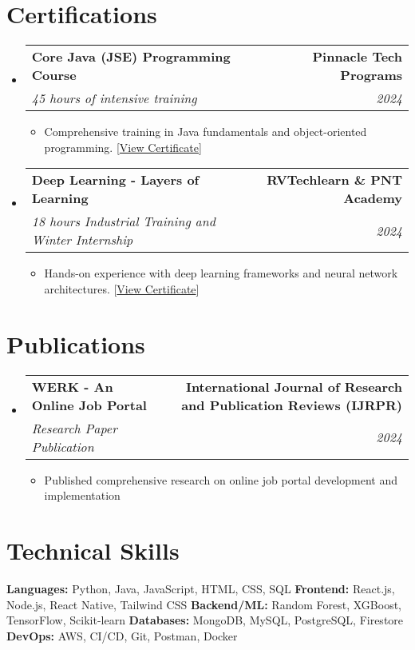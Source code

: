 \documentclass[letterpaper,11pt]{article}
\makeatletter
\newcommand{\resumeItem}[1]{
  \item\small{
    {#1 \vspace{-2pt}}
  }
}
\newcommand{\resumeSubheading}[4]{
  \vspace{-2pt}\item
  \begin{tabular*}{1.0\textwidth}[t]{l@{\extracolsep{\fill}}r}
    \textbf{#1} & \textbf{\small #2} \\
    \textit{\small#3} & \textit{\small #4} \\
  \end{tabular*}\vspace{-7pt}
}
\newcommand{\resumeSubHeadingListStart}{\begin{itemize}[leftmargin=0.0in, label={}]}
\newcommand{\resumeSubHeadingListEnd}{\end{itemize}}
\newcommand{\resumeItemListStart}{\begin{itemize}}
\newcommand{\resumeItemListEnd}{\end{itemize}\vspace{-5pt}}
\makeatother
\begin{document}
\section{Certifications}
\resumeSubHeadingListStart
  \resumeSubheading
    {Core Java (JSE) Programming Course}{Pinnacle Tech Programs}
    {45 hours of intensive training}{2024}
    \resumeItemListStart
      \resumeItem{Comprehensive training in Java fundamentals and object-oriented programming. [\href{https://drive.google.com/file/d/1Lf2cOTG3Nwv9vOYOVXjcn3a3jWpDPUBj/view?usp=sharing}{\color{blue}View Certificate}]}
    \resumeItemListEnd

  \resumeSubheading
    {Deep Learning - Layers of Learning}{RVTechlearn \& PNT Academy}
    {18 hours Industrial Training and Winter Internship}{2024}
    \resumeItemListStart
      \resumeItem{Hands-on experience with deep learning frameworks and neural network architectures. [\href{https://drive.google.com/file/d/1LZmzLzCd4g8qe_HMNEf_ERyJBaHTfGbe/view?usp=sharing}{\color{blue}View Certificate}]}
    \resumeItemListEnd
\resumeSubHeadingListEnd

\section{Publications}
\resumeSubHeadingListStart
  \resumeSubheading
    {WERK - An Online Job Portal}{International Journal of Research and Publication Reviews (IJRPR)}
    {Research Paper Publication}{2024}
    \resumeItemListStart
      \resumeItem{Published comprehensive research on online job portal development and implementation}
    \resumeItemListEnd
\resumeSubHeadingListEnd

\section{Technical Skills}
\small{
  \textbf{Languages:} Python, Java, JavaScript, HTML, CSS, SQL \quad
  \textbf{Frontend:} React.js, Node.js, React Native, Tailwind CSS \quad
  \textbf{Backend/ML:} Random Forest, XGBoost, TensorFlow, Scikit-learn \quad
  \textbf{Databases:} MongoDB, MySQL, PostgreSQL, Firestore \quad
  \textbf{DevOps:} AWS, CI/CD, Git, Postman, Docker
}
\vspace{-10pt}
\end{document}
